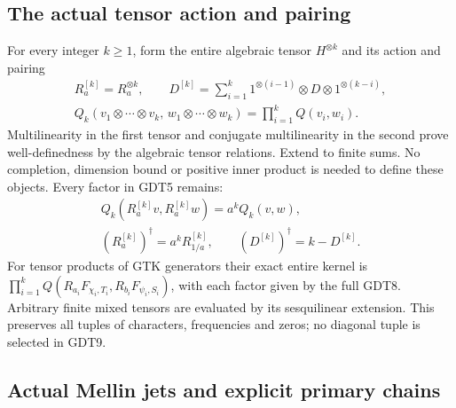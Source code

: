 \subsection{The actual tensor action and pairing}

For every integer $k\ge1$, form the entire algebraic tensor
$H^{\otimes k}$ and its action and pairing
\begin{equation}\tag{GDT9}
 \begin{gathered}
 R_a^{[k]}=R_a^{\otimes k},\qquad
 D^{[k]}=\sum_{i=1}^k
       1^{\otimes(i-1)}\otimes D\otimes1^{\otimes(k-i)},\\
 Q_k(v_1\otimes\cdots\otimes v_k,\,
          w_1\otimes\cdots\otimes w_k)
       =\prod_{i=1}^kQ(v_i,w_i).
 \end{gathered}
\end{equation}
Multilinearity in the first tensor and conjugate
multilinearity in the second prove well-definedness by
the algebraic tensor relations. Extend to finite sums.
No completion, dimension bound or positive inner product
is needed to define these objects.
Every factor in GDT5 remains:
\begin{equation}\tag{GDT10}
 \begin{gathered}
 Q_k(R_a^{[k]}v,R_a^{[k]}w)=a^kQ_k(v,w),\\
 (R_a^{[k]})^\dagger=a^kR_{1/a}^{[k]},
 \qquad (D^{[k]})^\dagger=k-D^{[k]}.
 \end{gathered}
\end{equation}
For tensor products of GTK generators their exact entire
kernel is $\prod_{i=1}^k
Q(R_{a_i}F_{\chi_i,T_i},R_{b_i}F_{\psi_i,S_i})$,
with each factor given by the full GDT8. Arbitrary finite
mixed tensors are evaluated by its sesquilinear extension.
This preserves all tuples of characters, frequencies and
zeros; no diagonal tuple is selected in GDT9.

\subsection{Actual Mellin jets and explicit primary chains}

